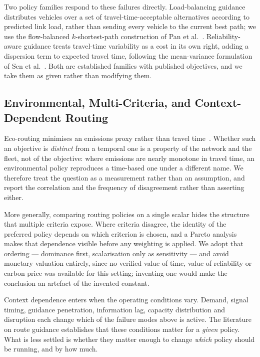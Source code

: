 \documentclass[runningheads]{llncs}
\begin{document}
Two policy families respond to these failures directly. Load-balancing guidance
distributes vehicles over a set of travel-time-acceptable alternatives
according to predicted link load, rather than sending every vehicle to the
current best path; we use the flow-balanced $k$-shortest-path construction of
Pan et al.~\cite{pan2013proactive}. Reliability-aware guidance treats
travel-time variability as a cost in its own right, adding a dispersion term to
expected travel time, following the mean-variance formulation of Sen et
al.~\cite{sen2001meanvariance}. Both are established families with published
objectives, and we take them as given rather than modifying them.

\subsection{Environmental, Multi-Criteria, and Context-Dependent Routing}

Eco-routing minimises an emissions proxy rather than travel
time~\cite{boriboonsomsin2012eco}. Whether such an objective is \emph{distinct}
from a temporal one is a property of the network and the fleet, not of the
objective: where emissions are nearly monotone in travel time, an
environmental policy reproduces a time-based one under a different name. We
therefore treat the question as a measurement rather than an assumption, and
report the correlation and the frequency of disagreement rather than asserting
either.

More generally, comparing routing policies on a single scalar hides the
structure that multiple criteria expose. Where criteria disagree, the identity
of the preferred policy depends on which criterion is chosen, and a Pareto
analysis makes that dependence visible before any weighting is applied. We
adopt that ordering --- dominance first, scalarisation only as sensitivity ---
and avoid monetary valuation entirely, since no verified value of time, value
of reliability or carbon price was available for this setting; inventing one
would make the conclusion an artefact of the invented constant.

Context dependence enters when the operating conditions vary. Demand, signal
timing, guidance penetration, information lag, capacity distribution and
disruption each change which of the failure modes above is active. The
literature on route guidance establishes that these conditions matter for a
\emph{given} policy. What is less settled is whether they matter enough to
change \emph{which} policy should be running, and by how much.
\end{document}
